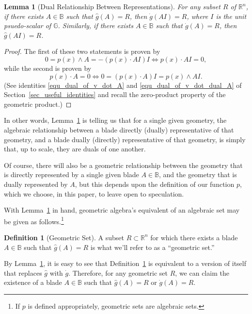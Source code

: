 \documentclass{birkjour}
\newtheorem{lem}[thm]{Lemma}
\theoremstyle{definition}
\newtheorem{defn}[thm]{Definition}
\theoremstyle{remark}
\numberwithin{equation}{section}
\newcommand{\R}{\mathbb{R}}
\newcommand{\B}{\mathbb{B}}
\newcommand{\G}{\mathbb{G}}
\newcommand{\gd}{\dot{g}}
\newcommand{\gh}{\hat{g}}
\begin{document}
\begin{lem}[Dual Relationship Between Representations]\label{lem_dual_rep}
For any subset $R$ of $\R^n$, if there exists $A\in\B$ such that $\gh(A)=R$, then $\gd(AI)=R$, where
$I$ is the unit psuedo-scalar of $\G$.  Similarly, if there exists $A\in\B$ such that $\gd(A)=R$, then $\gh(AI)=R$.
\end{lem}
\begin{proof}
The first of these two statements is proven by
\begin{equation*}
0=p(x)\wedge A=-(p(x)\cdot AI)I\iff p(x)\cdot AI=0,
\end{equation*}
while the second is proven by
\begin{equation*}
p(x)\cdot A=0\iff 0=(p(x)\cdot A)I=p(x)\wedge AI.
\end{equation*}
(See identities \eqref{equ_dual_of_v_dot_A} and \eqref{equ_dual_of_v_dot_dual_A} of Section~\ref{sec_useful_identities} and
recall the zero-product property of the geometric product.)
\end{proof}

In other words, Lemma~\ref{lem_dual_rep} is telling us that for a single given geometry, the algebraic relationship between a
blade directly (dually) representative of that geometry, and a blade dually (directly) representative of that geometry, is simply
that, up to scale, they are duals of one another.

Of course, there will also be a geometric relationship between the geometry that is directly represented by a single given
blade $A\in\B$, and the geometry that is dually represented by $A$, but this depends upon the definition of our function
$p$, which we choose, in this paper, to leave open to speculation.

With Lemma~\ref{lem_dual_rep} in hand, geometric algebra's equivalent of an algebraic set may be given as follows.\footnote{If $p$ is
defined appropriately, geometric sets are algebraic sets.}

\begin{defn}[Geometric Set]\label{def_geo_set}
A subset $R\subset\R^n$ for which there exists a blade $A\in\B$ such that $\gh(A)=R$ is what we'll refer to as a ``geometric set.''
\end{defn}

By Lemma~\ref{lem_dual_rep}, it is easy to see that Definition~\ref{def_geo_set} is equivalent to a version of itself that replaces $\gh$ with $\gd$.
Therefore, for any geometric set $R$, we can claim the existence of a blade $A\in\B$ such that $\gh(A)=R$ or $\gd(A)=R$.
\end{document}
